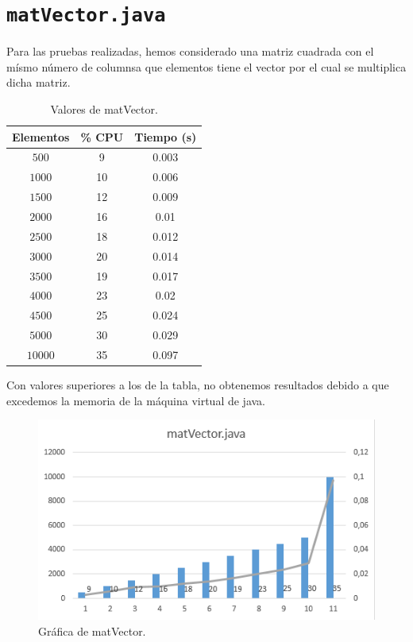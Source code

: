 \documentclass[12pt,letterpaper]{article}
\begin{document}
\section{\texttt{matVector.java}}
\noindent
Para las pruebas realizadas, hemos considerado una matriz cuadrada con el mísmo número de columnsa que elementos tiene el vector por el cual se multiplica dicha matriz.
\begin{center}
	\begin{table}[htbp]
		\begin{center}
			\begin{tabular}{|c|c|c|}
				\hline
				\textbf{Elementos} & \textbf{\% CPU} & \textbf{Tiempo (s)}  \\
				\hline 
				$500$ & 9 & 0.003\\ \hline	
				$1000$ & 10 & 0.006\\ \hline
				$1500$ & 12 & 0.009\\ \hline
				$2000$ & 16 & 0.01\\ \hline
				$2500$ & 18 & 0.012\\ \hline
				$3000$ & 20 & 0.014\\ \hline
				$3500$ & 19 & 0.017\\ \hline
				$4000$ & 23 & 0.02\\ \hline
				$4500$ & 25 & 0.024\\ \hline
				$5000$ & 30 & 0.029\\ \hline				
				$10000$ & 35 & 0.097\\ \hline	
			\end{tabular}
			\caption{Valores de matVector.}
			\label{tabla:Valores de matVector}
		\end{center}
	\end{table}
\end{center}
\noindent
Con valores superiores a los de la tabla, no obtenemos resultados debido a que excedemos la memoria de la máquina virtual de java.
\newpage
\begin{figure}
	\begin{center}
		\includegraphics[scale=1]{matVector.png}
		\caption{Gráfica de matVector.}
		\label{fig: matVector}
	\end{center}
\end{figure}
\end{document}
